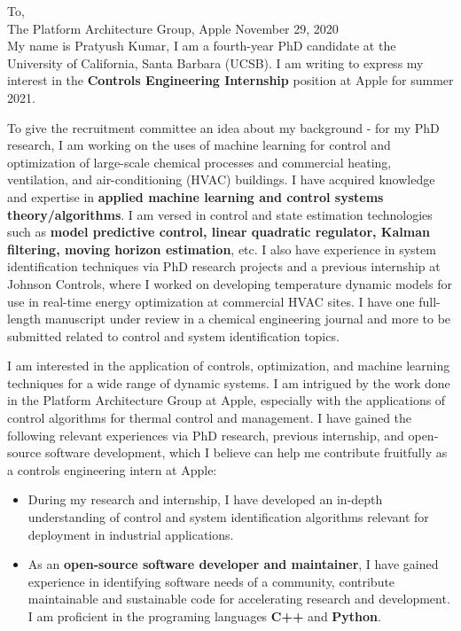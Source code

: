 \documentclass[12pt, a4paper, roman]{moderncv}        %
\begin{document}
\makecvtitle
\vspace*{-15mm}

\justifying
\vspace{0.1in}
To, \\
The Platform Architecture Group, Apple \hfill November 29, 2020 \\

\vspace{0.1in}
My name is Pratyush Kumar, I am a fourth-year PhD candidate at the University of California, Santa Barbara (UCSB). I am writing to express my interest in the \textbf{Controls Engineering Internship} position at Apple for summer 2021.

\vspace{0.1in}
To give the recruitment committee an idea about my background - for my 
PhD research, I am working on 
the uses of machine learning 
for control and optimization of 
large-scale chemical processes 
and commercial heating, ventilation, and air-conditioning 
(HVAC) buildings. I have acquired knowledge and expertise in \textbf{applied machine learning and control systems theory/algorithms}.
I am versed in control and state estimation technologies such as \textbf{model predictive control, linear quadratic regulator, Kalman filtering, moving horizon estimation}, etc. I also have experience in system identification techniques via PhD research projects and a
previous internship at Johnson Controls, 
where I worked on developing temperature dynamic models for use in 
real-time energy optimization at commercial HVAC sites.
I have one full-length manuscript under review in a chemical 
engineering journal and more to be submitted related to control and 
system identification topics.

\vspace{0.1in}
I am interested in the application of controls, optimization, and machine learning techniques for a wide range of dynamic systems.
I am intrigued by the work done in the Platform Architecture Group 
at Apple, especially with the applications of control algorithms 
for thermal control and management.
I have gained the following relevant experiences via 
PhD research, previous internship, and
open-source software development,
which I believe can help me contribute fruitfully 
as a controls engineering intern at Apple:

\vspace{0.1in}
\begin{itemize}
	\item During my research and internship, 
	I have developed an in-depth understanding of 
	control and system identification algorithms relevant 
	for deployment in industrial applications.
	\vspace{0.15in}
	\item As an \textbf{open-source software developer and maintainer},
	I have gained experience in identifying software needs 
	of a community, contribute maintainable and sustainable 
	code for accelerating research and development. I am 
	proficient in the programing languages \textbf{C++} and \textbf{Python}.
\end{itemize}
\end{document}
